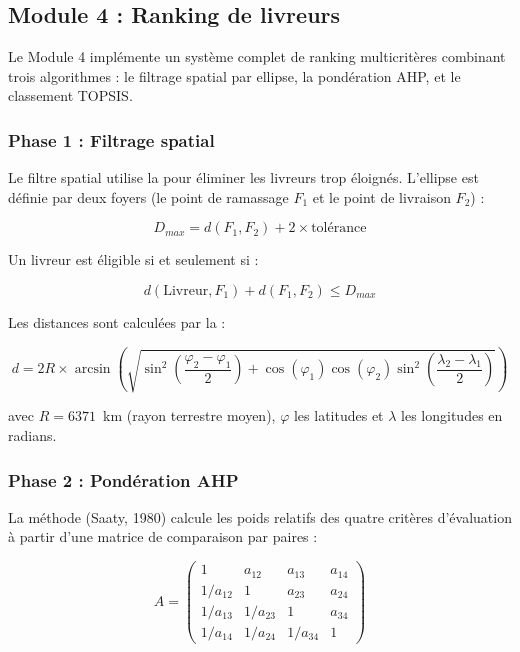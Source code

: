 \subsection{Module 4 : Ranking de livreurs}

Le Module 4 implémente un système complet de ranking multicritères combinant trois algorithmes : le filtrage spatial par ellipse, la pondération AHP, et le classement TOPSIS.

\subsubsection{Phase 1 : Filtrage spatial}

Le filtre spatial utilise la  pour éliminer les livreurs trop éloignés. L'ellipse est définie par deux foyers (le point de ramassage $F_1$ et le point de livraison $F_2$) :

\begin{equation}
D_{max} = d(F_1, F_2) + 2 \times \text{tol\'{e}rance}
\label{eq:dmax}
\end{equation}

Un livreur est éligible si et seulement si :

\begin{equation}
d(\text{Livreur}, F_1) + d(F_1, F_2) \leq D_{max}
\label{eq:ellipse-condition}
\end{equation}

Les distances sont calculées par la  :

\begin{equation}
d = 2R \times \arcsin\left(\sqrt{\sin^2\!\left(\frac{\varphi_2 - \varphi_1}{2}\right) + \cos(\varphi_1)\cos(\varphi_2)\sin^2\!\left(\frac{\lambda_2 - \lambda_1}{2}\right)}\right)
\label{eq:haversine}
\end{equation}

avec $R = 6371$~km (rayon terrestre moyen), $\varphi$ les latitudes et $\lambda$ les longitudes en radians.

\subsubsection{Phase 2 : Pondération AHP}

La méthode  (Saaty, 1980) calcule les poids relatifs des quatre critères d'évaluation à partir d'une matrice de comparaison par paires :

\begin{equation}
A = \begin{pmatrix}
1 & a_{12} & a_{13} & a_{14} \\
1/a_{12} & 1 & a_{23} & a_{24} \\
1/a_{13} & 1/a_{23} & 1 & a_{34} \\
1/a_{14} & 1/a_{24} & 1/a_{34} & 1
\end{pmatrix}
\label{eq:ahp-matrix}
\end{equation}

